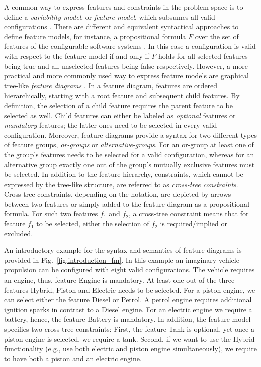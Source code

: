 {A common way to express features and constraints in the problem space is to
define a \emph{variability model}, or \emph{feature model}, which subsumes all
valid configurations
\citep{kang_feature-oriented_1990,apel_feature-oriented_2013}. There are different and equivalent syntactical approaches to define feature models, for instance, a propositional formula $F$ over the set of
features of the configurable software systems \citep{batory_feature_2005}. In
this case a configuration is valid with respect to the feature model if and only if $F$ holds for all
selected features being true and all unselected features being false respectively. 
However, a more practical and more commonly used way to express feature models
are graphical tree-like \emph{feature diagrams}
\citep{apel_feature-oriented_2013}. In a feature diagram, features are ordered
hierarchically, starting with a root feature and subsequent child features. By
definition, the selection of a child feature requires the parent feature to be
selected as well. Child features can either be labeled as \emph{optional}
features  or \emph{mandatory} features; the latter ones need to be selected in
every valid configuration.
Moreover, feature diagrams
provide a syntax for two different types of feature groups, \emph{or-groups} or
\emph{alternative-groups}. For an or-group at least one of the group's features
needs to be selected for a valid configuration, whereas for an alternative group
exactly one out of the group's mutually exclusive features must be selected. In
addition to the feature hierarchy, constraints, which cannot be expressed by
the tree-like structure, are referred to as \emph{cross-tree constraints}.
Cross-tree constraints, depending on the notation, are depicted by arrows
between two features or simply added to the feature diagram as a propositional
formula. For such two features $f_1$ and $f_2$, a cross-tree constraint means
that for feature $f_1$ to be selected, either the selection of $f_2$ is
required/implied or excluded.

An introductory example for the syntax and semantics of feature diagrams is
provided in Fig.~\ref{fig:introduction_fm}. In this example an imaginary
vehicle propulsion can be configured with eight valid configurations. The vehicle requires an engine,
thus, feature \textsf{Engine} is mandatory. At least one out of the three
features \textsf{Hybrid}, \textsf{Piston} and \textsf{Electric} needs to be
selected. For a piston engine, we can select either the feature \textsf{Diesel}
or \textsf{Petrol}. A petrol engine requires additional ignition sparks in
contrast to a Diesel engine. For an electric engine we require a
battery, hence, the feature \textsf{Battery} is mandatory.
In addition, the feature model specifies two cross-tree constraints: First, the
feature \textsf{Tank} is optional, yet once a piston engine is selected, we
require  a tank. Second, if we want to use the \textsf{Hybrid} functionality
(e.g., use both electric and piston engine simultaneously), we require to have both a piston
and an electric engine.

}
